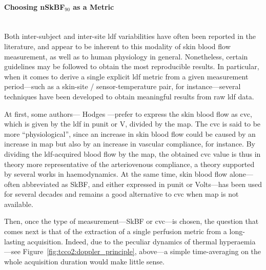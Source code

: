 \paragraph{Choosing \texorpdfstring{nSkBF$_{90}$}{nSkBF90} as a Metric}\mbox{}\\

Both inter-subject and inter-site \gls{ldf} variabilities have often been reported in the literature\cite{johnson1984, cracowski2006, roustit2012, minson2010, hodges2016, cracowski2016}, and appear to be inherent to this modality of skin blood flow measurement, as well as to human physiology in general. Nonetheless, certain guidelines may be followed to obtain the most reproducible results\cite{cracowski2006}. In particular, when it comes to derive a single explicit \gls{ldf} metric from a given measurement period---such as a skin-site / sensor-temperature pair, for instance---several techniques have been developed to obtain meaningful results from raw \gls{ldf} data.

At first, some authors---\eg{} Hodges \etal{}\cite{hodges2016}---prefer to express the skin blood flow as \gls{cvc}, which is given by the \gls{ldf} in \gls{punit} or V, divided by the \gls{map}. The \gls{cvc} is said to be more \enquote{physiological}\cite{cracowski2006}, since an increase in skin blood flow could be caused by an increase in \gls{map} but also by an increase in vascular compliance, for instance. By dividing the \gls{ldf}-acquired blood flow by the \gls{map}, the obtained \gls{cvc} value is thus in theory more representative of the arteriovenous compliance, a theory supported by several works in haemodynamics\cite{johnsonpc1986, lautt1989, herring2018levick}. At the same time, skin blood flow alone---often abbreviated as SkBF, and either expressed in \gls{punit} or Volts---has been used for several decades\cite{johnson1984, frantz2012} and remains a good alternative to \gls{cvc} when \gls{map} is not available.

Then, once the type of measurement---SkBF or \gls{cvc}---is chosen, the question that comes next is that of the extraction of a single perfusion metric from a long-lasting acquisition. Indeed, due to the peculiar dynamics of thermal hyperaemia---see Figure~\ref{fig:tcco2:doppler_principle}, above---a simple time-averaging on the whole acquisition duration would make little sense.


